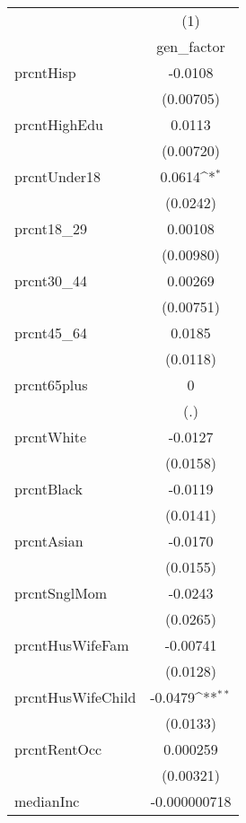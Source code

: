 {
\def\sym#1{\ifmmode^{#1}\else\(^{#1}\)\fi}
\begin{tabular}{l*{1}{c}}
\hline\hline
            &\multicolumn{1}{c}{(1)}\\
            &\multicolumn{1}{c}{gen\_factor}\\
\hline
prcntHisp   &     -0.0108         \\
            &   (0.00705)         \\
[1em]
prcntHighEdu&      0.0113         \\
            &   (0.00720)         \\
[1em]
prcntUnder18&      0.0614\sym{*}  \\
            &    (0.0242)         \\
[1em]
prcnt18\_29  &     0.00108         \\
            &   (0.00980)         \\
[1em]
prcnt30\_44  &     0.00269         \\
            &   (0.00751)         \\
[1em]
prcnt45\_64  &      0.0185         \\
            &    (0.0118)         \\
[1em]
prcnt65plus &           0         \\
            &         (.)         \\
[1em]
prcntWhite  &     -0.0127         \\
            &    (0.0158)         \\
[1em]
prcntBlack  &     -0.0119         \\
            &    (0.0141)         \\
[1em]
prcntAsian  &     -0.0170         \\
            &    (0.0155)         \\
[1em]
prcntSnglMom&     -0.0243         \\
            &    (0.0265)         \\
[1em]
prcntHusWifeFam&    -0.00741         \\
            &    (0.0128)         \\
[1em]
prcntHusWifeChild&     -0.0479\sym{**} \\
            &    (0.0133)         \\
[1em]
prcntRentOcc&    0.000259         \\
            &   (0.00321)         \\
[1em]
medianInc   &-0.000000718         \\

\end{tabular}}
